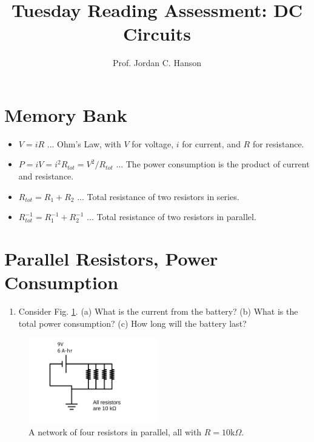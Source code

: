 \documentclass{article}
\begin{document}
\title{Tuesday Reading Assessment: DC Circuits}
\author{Prof. Jordan C. Hanson}

\maketitle

\section{Memory Bank}

\begin{itemize}
\item $V = i R$ ... Ohm's Law, with $V$ for voltage, $i$ for current, and $R$ for resistance.
\item $P = iV = i^2 R_{tot} = V^2/R_{tot}$ ... The power consumption is the product of current and resistance.
\item $R_{tot} = R_1 + R_2$ ... Total resistance of two resistors in series.
\item $R_{tot}^{-1} = R_1^{-1} + R_2^{-1}$ ... Total resistance of two resistors in parallel.
\end{itemize}

\section{Parallel Resistors, Power Consumption}

\begin{enumerate}
\item Consider Fig. \ref{fig:1}.  (a) What is the current from the battery?   (b) What is the total power consumption?  (c) How long will the battery last?
\end{enumerate}

\begin{figure}
\centering
\includegraphics[width=0.5\textwidth]{figures/circuitExample4.pdf}
\caption{\label{fig:1}  A network of four resistors in parallel, all with $R = 10$k$\Omega$.}
\end{figure}
\end{document}
